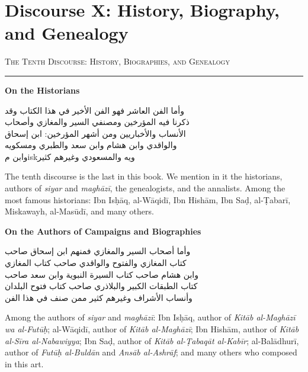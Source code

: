 \documentclass[11pt,a4paper]{article}
\newcommand{\ar}[1]{{\arabicfont\beginR #1\endR}}
\newcommand{\bilingual}[2]{%
  \noindent
  \begin{minipage}[t]{0.47\textwidth}
    \vspace{0pt}
    \begin{flushright}
    {\arabicfont\beginR #1\endR}
    \end{flushright}
  \end{minipage}%
  \hfill\vline\hfill
  \begin{minipage}[t]{0.47\textwidth}
    \vspace{0pt}
    #2
  \end{minipage}%
  \par\vspace{0.8em}
}
\newcommand{\bilingualsection}[2]{%
  \vspace{1em}%
  \noindent
  \begin{minipage}[t]{0.47\textwidth}
    \begin{flushright}
    \textsc{\color{sectioncolor}\ar{#1}}
    \end{flushright}
  \end{minipage}%
  \hfill
  \begin{minipage}[t]{0.47\textwidth}
    \textsc{\color{sectioncolor}#2}
  \end{minipage}%
  \par\vspace{0.5em}\hrule\vspace{0.8em}%
}
\newcommand{\bilingualsubsection}[2]{%
  \vspace{0.6em}%
  \noindent
  \begin{minipage}[t]{0.47\textwidth}
    \begin{flushright}
    \textbf{\color{sectioncolor}\ar{#1}}
    \end{flushright}
  \end{minipage}%
  \hfill
  \begin{minipage}[t]{0.47\textwidth}
    \textbf{\color{sectioncolor}#2}
  \end{minipage}%
  \par\vspace{0.4em}%
}
\begin{document}
\section{Discourse X: History, Biography, and Genealogy}
\label{sec:X}

\bilingualsection{الفن العاشر في التاريخ والسير والأنساب}{The Tenth Discourse: History, Biographies, and Genealogy}

\bilingualsubsection{في المؤرخين}{On the Historians}

\bilingual
{وأما الفن العاشر فهو الفن الأخير في هذا الكتاب وقد\\
ذكرنا فيه المؤرخين ومصنفي السير والمغازي وأصحاب\\
الأنساب والأخباريين ومن أشهر المؤرخين: ابن إسحاق\\
والواقدي وابن هشام وابن سعد والطبري ومسكويه\\
وابن مiskويه والمسعودي وغيرهم كثير}
{The tenth discourse is the last in this book. We mention in it the
historians, authors of \textit{siyar} and \textit{magh\=az\=i}, the
genealogists, and the annalists. Among the most famous historians: Ibn
Is\d{h}\=aq, al-W\=aqid\=i, Ibn Hish\=am, Ibn Sa\d{d}, al-\d{T}abar\=i,
Miskawayh, al-Mas\=ud\=i, and many others.}

\bilingualsubsection{في أصحاب السير والمغازي}{On the Authors of Campaigns and Biographies}

\bilingual
{وأما أصحاب السير والمغازي فمنهم ابن إسحاق صاحب\\
كتاب المغازي والفتوح والواقدي صاحب كتاب المغازي\\
وابن هشام صاحب كتاب السيرة النبوية وابن سعد صاحب\\
كتاب الطبقات الكبير والبلاذري صاحب كتاب فتوح البلدان\\
وأنساب الأشراف وغيرهم كثير ممن صنف في هذا الفن}
{Among the authors of \textit{siyar} and \textit{magh\=az\=i}: Ibn
Is\d{h}\=aq, author of \textit{Kit\=ab al-Magh\=az\=i wa al-Fut\=u\d{h}};
al-W\=aqid\=i, author of \textit{Kit\=ab al-Magh\=az\=i}; Ibn Hish\=am,
author of \textit{Kit\=ab al-S\=ira al-Nabawiyya}; Ibn Sa\d{d}, author of
\textit{Kit\=ab al-\d{T}abaq\=at al-Kab\=ir}; al-Bal\=adhur\=i, author of
\textit{Fut\=u\d{h} al-Buld\=an} and \textit{Ans\=ab al-Ashr\=af}; and
many others who composed in this art.}

\newpage
\end{document}
